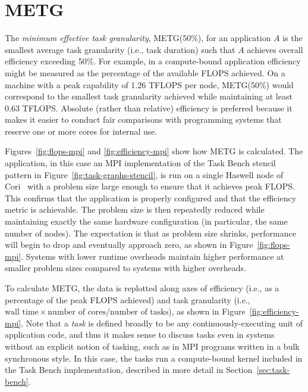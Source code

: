 \section{METG}
\label{sec:metg}




The \emph{minimum effective task granularity}, METG(50\%), for an application $A$ is
the smallest average task granularity (i.e., task duration) such that $A$
achieves overall efficiency exceeding 50\%. For example, in
a compute-bound application efficiency might be measured as the
percentage of the available FLOPS achieved. On a machine with a peak
capability of 1.26 TFLOPS per node, METG(50\%) would correspond to
the smallest task granularity achieved while maintaining at least 0.63
TFLOPS. Absolute (rather than relative) efficiency is preferred
because it makes it easier to conduct fair comparisons with
programming systems that reserve one or more cores for internal use.

Figures~\ref{fig:flops-mpi} and \ref{fig:efficiency-mpi} show how METG is
calculated. The application, in this case an MPI implementation of the
Task Bench stencil pattern in Figure~\ref{fig:task-graphs-stencil}, is
run on a single Haswell node of Cori~\cite{Cori} with a problem size large enough to
ensure that it achieves peak FLOPS. This confirms
that the application is properly configured and that the
efficiency metric is achievable. The problem
size is then repeatedly reduced while maintaining exactly the same hardware
configuration (in particular, the same number of nodes). The
expectation is that as problem size shrinks,
performance will begin to drop and eventually approach zero, as shown in Figure~\ref{fig:flops-mpi}. Systems
with lower runtime overheads maintain higher performance at smaller
problem sizes compared to systems with higher overheads.

To calculate METG, the data is replotted along axes of efficiency
(i.e., as a percentage of the peak FLOPS achieved) and task
granularity (i.e., $\text{wall time} \times \text{number of
  cores}/\text{number of tasks}$), as shown in Figure~\ref{fig:efficiency-mpi}. Note that a \emph{task} is defined
broadly to be any continuously-executing unit of application code,
and thus it makes sense to discuss tasks even in systems
without an explicit notion of tasking, such as in MPI programs written in a bulk synchronous style. In this case, the tasks run a
compute-bound kernel included in the Task Bench implementation,
described in more detail in Section~\ref{sec:task-bench}.

